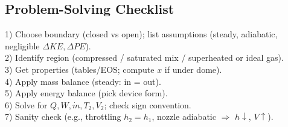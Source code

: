 \documentclass[10pt]{article}
\begin{document}
\begin{multicols}{2}
\section{Problem-Solving Checklist}
1) Choose boundary (closed vs open); list assumptions (steady, adiabatic, negligible $\Delta KE,\Delta PE$). \\
2) Identify region (compressed / saturated mix / superheated or ideal gas). \\
3) Get properties (tables/EOS; compute $x$ if under dome). \\
4) Apply mass balance (steady: in = out). \\
5) Apply energy balance (pick device form). \\
6) Solve for $Q,W,\dot m,T_2,V_2$; check sign convention. \\
7) Sanity check (e.g., throttling $h_2=h_1$, nozzle adiabatic $\Rightarrow$ $h\downarrow$, $V\uparrow$). \\

\end{multicols}
\end{document}
